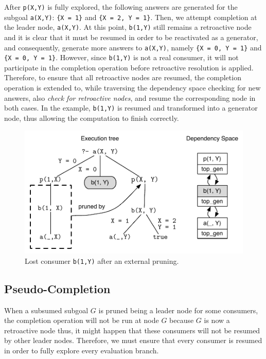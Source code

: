 After \texttt{p(X,Y)} is fully explored, the following answers are generated for the subgoal \texttt{a(X,Y)}:
\texttt{\{X~=~1\}} and \texttt{\{X~=~2,~Y~=~1\}}. Then, we attempt completion at the leader node,
\texttt{a(X,Y)}. At this point, \texttt{b(1,Y)} still remains
a retroactive node and it is clear that it must be resumed in order to be reactivated as a generator,
and consequently, generate more answers to \texttt{a(X,Y)}, namely \texttt{\{X~=~0,~Y~=~1\}} and
\texttt{\{X~=~0,~Y~=~1\}}. However, since \texttt{b(1,Y)} is not a real consumer, it will not participate
in the completion operation before retroactive resolution is applied. Therefore, to ensure that all
retroactive nodes are resumed, the completion operation is extended to, while traversing the dependency space
checking for new answers, also \textit{check for retroactive nodes}, and resume the corresponding
node in both cases. In the example, \texttt{b(1,Y)} is resumed and transformed into a
generator node, thus allowing the computation to finish correctly.

\begin{figure}[ht]
  \centering
    \includegraphics[scale=0.6]{retro_lost_consumer.pdf}
  \caption{Lost consumer \texttt{b(1,Y)} after an external pruning.}
  \label{fig:retro_lost_consumer}
\end{figure}

\subsection{Pseudo-Completion}

When a subsumed subgoal $G$ is pruned being a leader node for some consumers, the completion operation
will not be run at node $G$ because $G$ is now a retroactive node thus, it might happen that these consumers
will not be resumed by other leader nodes. Therefore, we must ensure that every consumer is
resumed in order to fully explore every evaluation branch.

